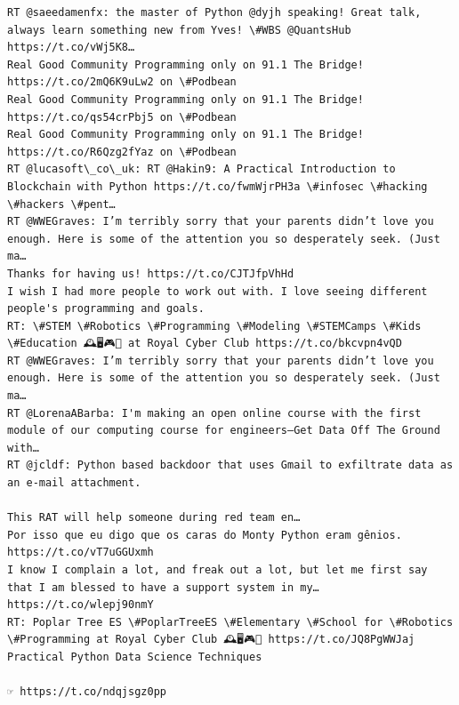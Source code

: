 \documentclass[11pt]{article}
\begin{document}
\begin{Verbatim}[commandchars=\\\{\}]
RT @saeedamenfx: the master of Python @dyjh speaking! Great talk, always learn something new from Yves! \#WBS @QuantsHub https://t.co/vWj5K8…
Real Good Community Programming only on 91.1 The Bridge! https://t.co/2mQ6K9uLw2 on \#Podbean
Real Good Community Programming only on 91.1 The Bridge! https://t.co/qs54crPbj5 on \#Podbean
Real Good Community Programming only on 91.1 The Bridge! https://t.co/R6Qzg2fYaz on \#Podbean
RT @lucasoft\_co\_uk: RT @Hakin9: A Practical Introduction to Blockchain with Python https://t.co/fwmWjrPH3a \#infosec \#hacking \#hackers \#pent…
RT @WWEGraves: I’m terribly sorry that your parents didn’t love you enough. Here is some of the attention you so desperately seek. (Just ma…
Thanks for having us! https://t.co/CJTJfpVhHd
I wish I had more people to work out with. I love seeing different people's programming and goals.
RT: \#STEM \#Robotics \#Programming \#Modeling \#STEMCamps \#Kids \#Education 🕰️🖥️🎮💎 at Royal Cyber Club https://t.co/bkcvpn4vQD
RT @WWEGraves: I’m terribly sorry that your parents didn’t love you enough. Here is some of the attention you so desperately seek. (Just ma…
RT @LorenaABarba: I'm making an open online course with the first module of our computing course for engineers—Get Data Off The Ground with…
RT @jcldf: Python based backdoor that uses Gmail to exfiltrate data as an e-mail attachment.

This RAT will help someone during red team en…
Por isso que eu digo que os caras do Monty Python eram gênios. https://t.co/vT7uGGUxmh
I know I complain a lot, and freak out a lot, but let me first say that I am blessed to have a support system in my… https://t.co/wlepj90nmY
RT: Poplar Tree ES \#PoplarTreeES \#Elementary \#School for \#Robotics \#Programming at Royal Cyber Club 🕰️🖥️🎮💎 https://t.co/JQ8PgWWJaj
Practical Python Data Science Techniques

☞ https://t.co/ndqjsgz0pp


\end{Verbatim}
\end{document}
